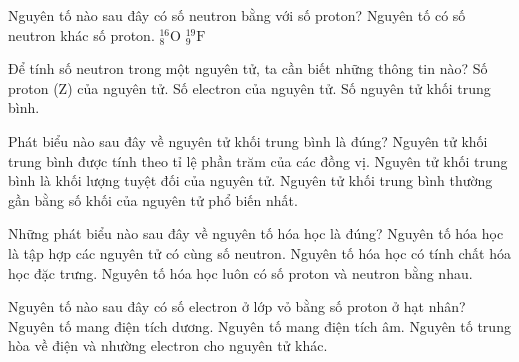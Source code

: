 \begin{ex}%
	Nguyên tố nào sau đây có số neutron bằng với số proton?
	{Nguyên tố có số neutron khác số proton.}
	{\True $^{16}_{8}\text{O}$}
	{$^{19}_{9}\text{F}$}
\end{ex}

\begin{ex}%
	Để tính số neutron trong một nguyên tử, ta cần biết những thông tin nào?
	{\True Số proton (Z) của nguyên tử.}
	{Số electron của nguyên tử.}
	{Số nguyên tử khối trung bình.}
\end{ex}

\begin{ex}%
	Phát biểu nào sau đây về nguyên tử khối trung bình là đúng?
	{\True Nguyên tử khối trung bình được tính theo tỉ lệ phần trăm của các đồng vị.}
	{Nguyên tử khối trung bình là khối lượng tuyệt đối của nguyên tử.}
	{\True Nguyên tử khối trung bình thường gần bằng số khối của nguyên tử phổ biến nhất.}
\end{ex}

\begin{ex}%
	Những phát biểu nào sau đây về nguyên tố hóa học là đúng?
	{Nguyên tố hóa học là tập hợp các nguyên tử có cùng số neutron.}
	{\True Nguyên tố hóa học có tính chất hóa học đặc trưng.}
	{Nguyên tố hóa học luôn có số proton và neutron bằng nhau.}
\end{ex}
\begin{ex}%
	Nguyên tố nào sau đây có số electron ở lớp vỏ bằng số proton ở hạt nhân?
	{Nguyên tố mang điện tích dương.}
	{Nguyên tố mang điện tích âm.}
	{ Nguyên tố trung hòa về điện và nhường electron cho nguyên tử khác.}
\end{ex}


